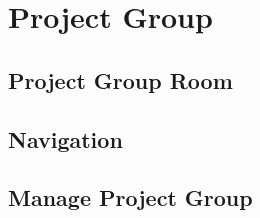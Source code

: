 \section{Project Group}
\subsection{Project Group Room}

\subsection{Navigation}

\subsection{Manage Project Group}